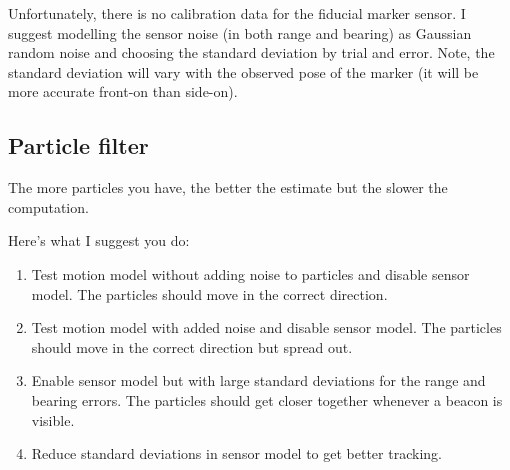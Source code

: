 \documentclass[a4paper, 12]{article}
\begin{document}
Unfortunately, there is no calibration data for the fiducial marker
sensor.  I suggest modelling the sensor noise (in both range and
bearing) as Gaussian random noise and choosing the standard deviation
by trial and error.  Note, the standard deviation will vary with the
observed pose of the marker (it will be more accurate front-on than
side-on).

\subsection{Particle filter}

The more particles you have, the better the estimate but the slower
the computation.

Here's what I suggest you do:

\begin{enumerate}
\item Test motion model without adding noise to particles and disable
  sensor model.  The particles should move in the correct direction.

\item Test motion model with added noise and disable sensor model.
  The particles should move in the correct direction but spread out.

\item Enable sensor model but with large standard deviations for the
  range and bearing errors.  The particles should get closer together
  whenever a beacon is visible.

\item Reduce standard deviations in sensor model to get better
  tracking.
\end{enumerate}
\end{document}
